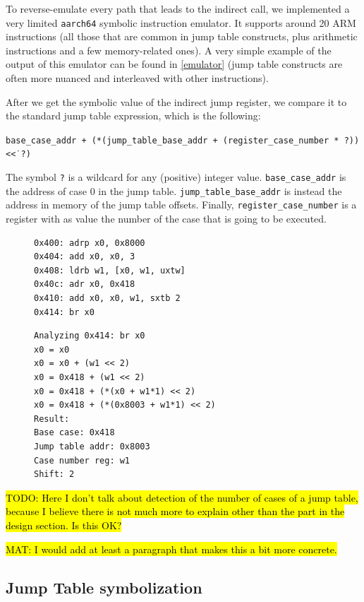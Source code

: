 \documentclass[a4paper,11pt,oneside]{report}
\DeclareRobustCommand{\todo}[1]{{\sethlcolor{cyan}\hl{TODO: #1}}}
\DeclareRobustCommand{\mat}[1]{{\sethlcolor{red}\hl{MAT: #1}}}
\begin{document}
To reverse-emulate every path that leads to the indirect call, we implemented a
very limited \texttt{aarch64} symbolic instruction emulator. It supports around
20 ARM instructions (all those that are common in jump table constructs, plus
arithmetic instructions and a few memory-related ones).  A very simple example of the
output of this emulator can be found in \autoref{emulator} (jump table constructs are 
often more nuanced and interleaved with other instructions).

After we get the symbolic value of the indirect jump register, we compare it to
the standard jump table expression, which is the following:

\texttt{base\_case\_addr + (*(jump\_table\_base\_addr + (register\_case\_number * ?)) \textless\.\textless\  ?)} 

The symbol \texttt{?} is a wildcard for any (positive) integer value.
\texttt{base\_case\_addr} is the address of case 0 in the jump table.
\texttt{jump\_table\_base\_addr} is instead the address in memory of the jump
table offsets. Finally, \texttt{register\_case\_number} is a register with as
value the number of the case that is going to be executed. 


\begin{figure}[h]
\begin{lstlisting}[basicstyle=\ttfamily\small,numbers=none]
0x400: adrp x0, 0x8000
0x404: add x0, x0, 3
0x408: ldrb w1, [x0, w1, uxtw]
0x40c: adr x0, 0x418
0x410: add x0, x0, w1, sxtb 2
0x414: br x0
\end{lstlisting}
\begin{lstlisting}[basicstyle=\ttfamily\small,numbers=none]
Analyzing 0x414: br x0
x0 = x0
x0 = x0 + (w1 << 2)
x0 = 0x418 + (w1 << 2)
x0 = 0x418 + (*(x0 + w1*1) << 2)
x0 = 0x418 + (*(0x8003 + w1*1) << 2)
Result:
Base case: 0x418
Jump table addr: 0x8003
Case number reg: w1
Shift: 2
\end{lstlisting}
\label{emulator}
\end{figure}


\todo{Here I don't talk about detection of the number of cases of a jump table,
because I believe there is not much more to explain other than the part in the
design section. Is this OK?}

\mat{I would add at least a paragraph that makes this a bit more concrete.}


\subsection{Jump Table symbolization}
\end{document}
